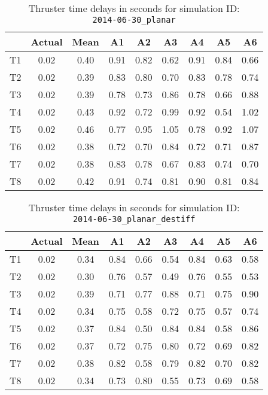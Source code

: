 \begin{table}[H]
\centering
\cprotect\caption{Thruster time delays in seconds for simulation ID:\\
\verb|2014-06-30_planar|}
\begin{tabular}{|c|c|c|c|c|c|c|c|c|} \hline
~ & Actual & Mean & A1 & A2 & A3 & A4 & A5 & A6 \\ \hline
T1 & 0.02 & 0.40 & 0.91 & 0.82 & 0.62 & 0.91 & 0.84 & 0.66 \\
T2 & 0.02 & 0.39 & 0.83 & 0.80 & 0.70 & 0.83 & 0.78 & 0.74 \\
T3 & 0.02 & 0.39 & 0.78 & 0.73 & 0.86 & 0.78 & 0.66 & 0.88 \\
T4 & 0.02 & 0.43 & 0.92 & 0.72 & 0.99 & 0.92 & 0.54 & 1.02 \\
T5 & 0.02 & 0.46 & 0.77 & 0.95 & 1.05 & 0.78 & 0.92 & 1.07 \\
T6 & 0.02 & 0.38 & 0.72 & 0.70 & 0.84 & 0.72 & 0.71 & 0.87 \\
T7 & 0.02 & 0.38 & 0.83 & 0.78 & 0.67 & 0.83 & 0.74 & 0.70 \\
T8 & 0.02 & 0.42 & 0.91 & 0.74 & 0.81 & 0.90 & 0.81 & 0.84 \\ \hline
\end{tabular}
\label{delay-1}
\end{table}

\begin{table}[H]
\centering
\cprotect\caption{Thruster time delays in seconds for simulation ID:\\
\verb|2014-06-30_planar_destiff|}
\begin{tabular}{|c|c|c|c|c|c|c|c|c|} \hline
~ & Actual & Mean & A1 & A2 & A3 & A4 & A5 & A6 \\ \hline
T1 & 0.02 & 0.34 & 0.84 & 0.66 & 0.54 & 0.84 & 0.63 & 0.58 \\
T2 & 0.02 & 0.30 & 0.76 & 0.57 & 0.49 & 0.76 & 0.55 & 0.53 \\
T3 & 0.02 & 0.39 & 0.71 & 0.77 & 0.88 & 0.71 & 0.75 & 0.90 \\
T4 & 0.02 & 0.34 & 0.75 & 0.58 & 0.72 & 0.75 & 0.57 & 0.74 \\
T5 & 0.02 & 0.37 & 0.84 & 0.50 & 0.84 & 0.84 & 0.58 & 0.86 \\
T6 & 0.02 & 0.37 & 0.72 & 0.75 & 0.80 & 0.72 & 0.69 & 0.82 \\
T7 & 0.02 & 0.38 & 0.82 & 0.58 & 0.79 & 0.82 & 0.70 & 0.82 \\
T8 & 0.02 & 0.34 & 0.73 & 0.80 & 0.55 & 0.73 & 0.69 & 0.58 \\ \hline
\end{tabular}
\label{delay-2}
\end{table}


